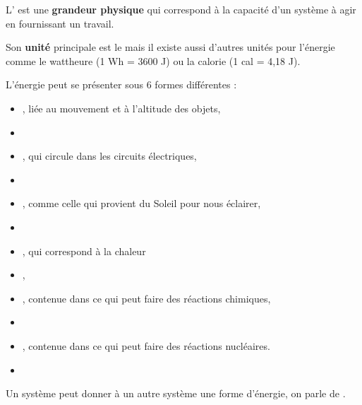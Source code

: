 \documentclass[11pt,a4paper]{article}
\begin{document}
\pagination



L' est une \textbf{grandeur physique} qui correspond à la capacité d'un système à agir en fournissant un travail.

Son \textbf{unité} principale est le  mais il existe aussi d'autres unités pour l'énergie comme le wattheure (1 Wh = 3600 J) ou la calorie (1 cal = 4,18 J).

L'énergie peut se présenter sous 6 formes différentes :
\begin{itemize}
    \item {}, liée au mouvement et à l'altitude des objets, \item[] 
    \item {}, qui circule dans les circuits électriques,
    \item[] 
    \item {}, comme celle qui provient du Soleil pour nous éclairer,
    \item[] 
    \item {}, qui correspond à la chaleur
    \item[] ,
    \item {}, contenue dans ce qui peut faire des réactions chimiques,
    \item[] 
    \item {}, contenue dans ce qui peut faire des réactions nucléaires.
    \item[] 
\end{itemize}



Un système peut donner à un autre système une forme d'énergie, on parle de .\\
\end{document}
